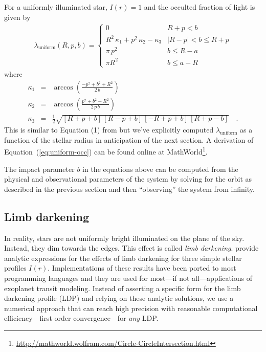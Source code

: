 \documentclass[12pt,preprint]{aastex}
\newcommand{\project}[1]{{\sffamily #1}}
\newcommand{\Eq}[1]{Equation~(\ref{eq:#1})}
\newcommand{\eq}[1]{\Eq{#1}}
\newcommand{\eqlabel}[1]{\label{eq:#1}}
\begin{document}
For a uniformly illuminated star, $I(r) = 1$ and the occulted fraction of
light is given by
\begin{eqnarray}\eqlabel{uniform-occ}
    \lambda_\mathrm{uniform} (R, p, b) = \left \{ \begin{array}{ll}
            0 & R + p < b \\
            R^2 \, \kappa_1 + p^2 \, \kappa_2 - \kappa_3
                & |R - p| < b \leq R + p \\
            \pi \, p^2 & b \leq R - a \\
            \pi R^2 & b \leq a - R
        \end{array} \right.
\end{eqnarray}
where
\begin{eqnarray}
    \kappa_1 & = & \arccos \left ( \frac{-p^2 + b^2 + R^2}{2 \, b} \right ) \\
    \kappa_2 & = & \arccos \left ( \frac{p^2 + b^2 - R^2}{2\, p \, b}
                           \right ) \\
    \kappa_3 & = & \frac{1}{2} \sqrt{[R + p + b] \, [R - p + b]
                        \, [-R + p + b] \, [R + p - b]} \quad.
\end{eqnarray}
This is similar to Equation (1) from \citet{mandel} but we've explicitly
computed $\lambda_\mathrm{uniform}$ as a function of the stellar radius in
anticipation of the next section.
A derivation of \eq{uniform-occ} can be found online at
\project{MathWorld}\footnote{%
\url{http://mathworld.wolfram.com/Circle-CircleIntersection.html}}.

The impact parameter $b$ in the equations above can be computed from the
physical and observational parameters of the system by solving for the orbit
as described in the previous section and then ``observing'' the system from
infinity.


\subsection{Limb darkening}

In reality, stars are not uniformly bright illuminated on the plane of the
sky.
Instead, they dim towards the edges.
This effect is called \emph{limb darkening}.
\citet{mandel} provide analytic expressions for the
effects of limb darkening for three simple stellar profiles $I(r)$.
Implementations of these results have been ported to most programming
languages and they are used for most---if not all---applications of exoplanet
transit modeling.
Instead of asserting a specific form for the limb darkening
profile (LDP) and relying on these analytic solutions, we use a numerical
approach that can reach high precision with reasonable computational
efficiency---first-order convergence---for \emph{any} LDP.
\end{document}

